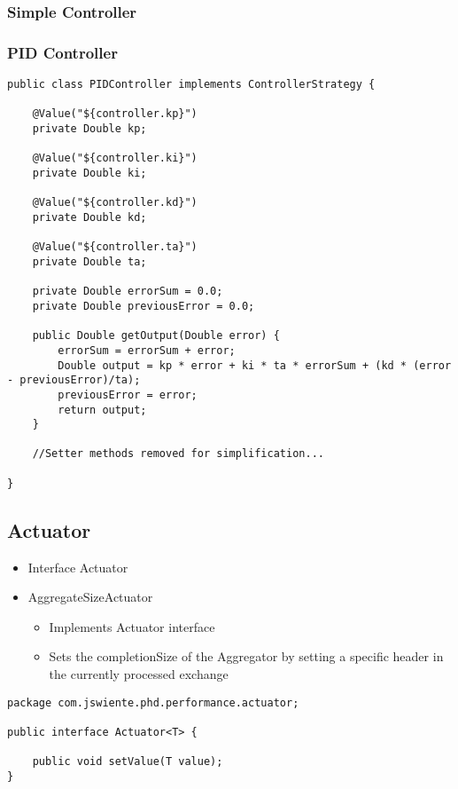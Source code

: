 \subsubsection{Simple Controller}

\subsubsection{PID Controller}

\begin{lstlisting}[caption={Implementation of PID Controller},label=listing:ch5_pid_controller]
public class PIDController implements ControllerStrategy {
	
	@Value("${controller.kp}")
	private Double kp;
	
	@Value("${controller.ki}")
	private Double ki;
	
	@Value("${controller.kd}")
	private Double kd;
	
	@Value("${controller.ta}")
	private Double ta;
	
	private Double errorSum = 0.0;
	private Double previousError = 0.0;

	public Double getOutput(Double error) {
		errorSum = errorSum + error;
		Double output = kp * error + ki * ta * errorSum + (kd * (error - previousError)/ta);
		previousError = error;
		return output;
	}

	//Setter methods removed for simplification...

}

\end{lstlisting}

\subsection{Actuator}

\begin{itemize}
	\item Interface Actuator
	\item AggregateSizeActuator
	\begin{itemize}
		\item Implements Actuator interface
		\item Sets the completionSize of the Aggregator by setting a specific header in the currently processed exchange
	\end{itemize}
\end{itemize}
\begin{lstlisting}[caption={Actuator Interface},label=listing:ch5_actuator_interface]
package com.jswiente.phd.performance.actuator;

public interface Actuator<T> {

	public void setValue(T value);
}
\end{lstlisting}

